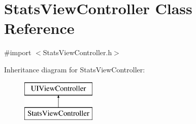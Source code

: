\hypertarget{interface_stats_view_controller}{\section{Stats\-View\-Controller Class Reference}
\label{interface_stats_view_controller}
}


{\ttfamily \#import $<$Stats\-View\-Controller.\-h$>$}

Inheritance diagram for Stats\-View\-Controller\-:\begin{figure}[H]
\begin{center}
\leavevmode
\includegraphics[height=2.000000cm]{interface_stats_view_controller}
\end{center}
\end{figure}

